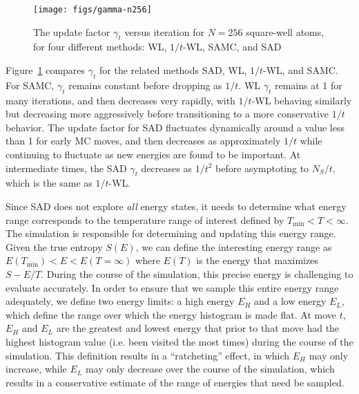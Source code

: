 \documentclass[letterpaper,twocolumn,amsmath,amssymb,pre,aps,10pt]{revtex4-1}
\begin{document}
\begin{figure}
  \texttt{[image: figs/gamma-n256]}
  \caption{The update factor $\gamma_t$ versus iteration for $N=256$
    square-well atoms, for four different methods: WL, $1/t$-WL, SAMC,
    and SAD}
    \label{fig:gamma-vs-t}
\end{figure}
Figure~\ref{fig:gamma-vs-t} compares $\gamma_t$ for the related
methods SAD, WL, $1/t$-WL, and SAMC.  For SAMC, $\gamma_t$ remains
constant before dropping as $1/t$.  WL $\gamma_t$ remains at 1 for
many iterations, and then decreases very rapidly, with $1/t$-WL
behaving similarly but decreasing more aggressively before
transitioning to a more conservative $1/t$ behavior.  The update
factor for SAD fluctuates dynamically around a value less than 1 for
early MC moves, and then decreases as approximately $1/t$ while
continuing to fluctuate as new energies are found to be important.  At
intermediate times, the SAD $\gamma_t$ decreases as $1/t^2$ before
asymptoting to $N_S/t$, which is the same as $1/t$-WL.

Since SAD does not explore \emph{all} energy states, it needs to
determine what energy range corresponds to the temperature range of
interest defined by $T_{\min}<T<\infty$. The simulation is responsible
for determining and updating this energy range. Given the true entropy
$S(E)$, we can define the interesting energy range as
  $E(T_{\min}) <E< E(T=\infty)$
where $E(T)$ is the energy that maximizes $S-E/T$.  During the course of the
simulation, this precise energy is challenging to evaluate accurately.
In order to ensure that we sample this entire energy range adequately,
we define two energy limits:  a high energy $E_H$ and a low
energy $E_L$, which define the range over which the energy histogram
is made flat. At move $t$, $E_H$ and $E_L$ are the greatest and lowest
energy that prior to that move
had the highest histogram value (i.e. been visited the most times) during
the course of the simulation.
This definition results in a ``ratcheting'' effect, in which $E_H$
may only increase, while $E_L$ may only decrease over the course of the
simulation, which results in a conservative estimate of the range of
energies that need be sampled.
\end{document}
